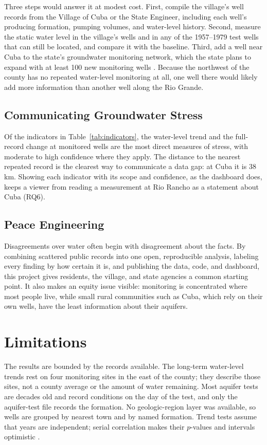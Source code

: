 \documentclass[10pt,twocolumn,letterpaper]{article}
\begin{document}
Three steps would answer it at modest cost. First, compile the village's well records from the
Village of Cuba or the State Engineer, including each well's producing formation, pumping volumes,
and water-level history. Second, measure the static water level in the village's wells and in any of
the 1957--1979 test wells that can still be located, and compare it with the baseline. Third, add a
well near Cuba to the state's groundwater monitoring network, which the state plans to expand with
at least 100 new monitoring wells \citep{cook2026}. Because the northwest of the county has no
repeated water-level monitoring at all, one well there would likely add more information than
another well along the Rio Grande.

\subsection{Communicating Groundwater Stress}
Of the indicators in Table~\ref{tab:indicators}, the water-level trend and the full-record change at
monitored wells are the most direct measures of stress, with moderate to high confidence where they
apply. The distance to the nearest repeated record is the clearest way to communicate a data gap:
at Cuba it is 38\,km. Showing each indicator with its scope and confidence, as the dashboard does,
keeps a viewer from reading a measurement at Rio Rancho as a statement about Cuba (RQ6).

\subsection{Peace Engineering}
Disagreements over water often begin with disagreement about the facts. By combining scattered
public records into one open, reproducible analysis, labeling every finding by how certain it is,
and publishing the data, code, and dashboard, this project gives residents, the village, and state
agencies a common starting point. It also makes an equity issue visible: monitoring is concentrated
where most people live, while small rural communities such as Cuba, which rely on their own wells,
have the least information about their aquifers.

\section{Limitations}\label{sec:limits}
The results are bounded by the records available. The long-term water-level trends rest on four
monitoring sites in the east of the county; they describe those sites, not a county average or the
amount of water remaining. Most aquifer tests are decades old and record conditions on the day of
the test, and only the aquifer-test file records the formation. No geologic-region layer was
available, so wells are grouped by nearest town and by named formation. Trend tests assume that
years are independent; serial correlation makes their $p$-values and intervals optimistic
\citep{helsel2020}.
\end{document}
